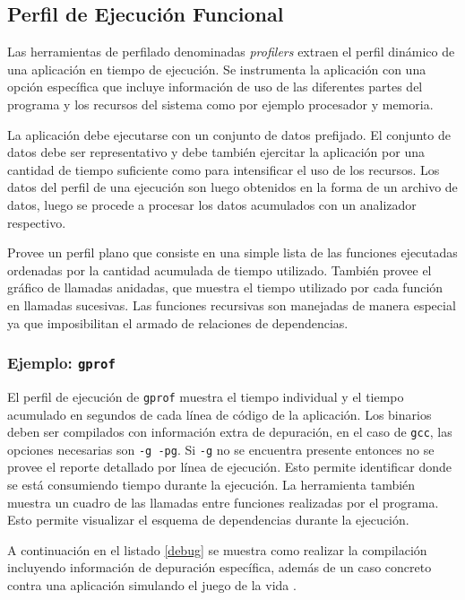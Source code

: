 \documentclass[a4paper]{report}
\begin{document}
\subsection{Perfil de Ejecución Funcional}

Las herramientas de perfilado denominadas {\it profilers} extraen el perfil dinámico de una aplicación en tiempo de ejecución. 
Se instrumenta la aplicación con una opción específica que incluye información de uso de las diferentes partes del programa y los recursos del sistema como por ejemplo procesador y memoria.

\bigskip

La aplicación debe ejecutarse con un conjunto de datos prefijado. El conjunto de datos debe ser representativo y debe también ejercitar la aplicación por
una cantidad de tiempo suficiente como para intensificar el uso de los recursos. Los datos del perfil de una ejecución son luego obtenidos en la
forma de un archivo de datos, luego se procede a procesar los datos acumulados con un analizador respectivo.

\bigskip

Provee un perfil plano que consiste en una simple lista de las funciones ejecutadas ordenadas por la cantidad acumulada de tiempo utilizado.
También provee el gráfico de llamadas anidadas, que muestra el tiempo utilizado por cada función en llamadas sucesivas. Las funciones recursivas
son manejadas de manera especial ya que imposibilitan el armado de relaciones de dependencias.

\subsubsection{Ejemplo: {\tt gprof}}

El perfil de ejecución de {\tt gprof} muestra el tiempo individual y el tiempo acumulado en segundos de cada línea de código de la aplicación. Los binarios deben ser compilados con información extra de depuración, en el caso de {\tt gcc}, las opciones necesarias son {\tt -g -pg}. Si {\tt -g} no se encuentra presente entonces no se provee el reporte detallado por línea de ejecución. Esto permite identificar donde se está consumiendo tiempo durante la ejecución.
La herramienta también muestra un cuadro de las llamadas entre funciones realizadas por el programa.
Esto permite visualizar el esquema de dependencias durante la ejecución.

\bigskip

A continuación en el listado \ref{debug} se muestra como realizar la compilación incluyendo información de depuración específica, además de un caso concreto contra una aplicación simulando el juego de la vida \cite{conway}.
\end{document}
